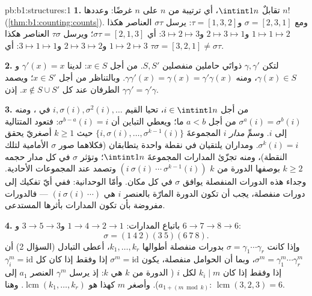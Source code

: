 \begin{solution}{pb:b1:structures:1}
\textbf{1.}  تقابلٌ  $\intint1n$، أي
ترتيبة من  $n$ على $n$ غرضًا: وعددها $n!$
(\cref{thm:b1:counting:counts}). ومع $\sigma = [2,3,1]$ و$\tau =
[1,3,2]$: يرسل $\sigma\tau$ العناصر هكذا $1 \mapsto 1 \mapsto 2$ و$2 \mapsto 3
\mapsto 1$ و$3 \mapsto 2 \mapsto 3$: أي $\sigma\tau = [2,1,3]$؛ ويرسل
$\tau\sigma$ العناصر هكذا $1 \mapsto 2 \mapsto 3$ و$2 \mapsto 3 \mapsto
2$ و$3 \mapsto 1 \mapsto 1$: أي $\tau\sigma = [3,2,1] \neq
\sigma\tau$.

\textbf{2.} لتكن $\gamma, \gamma'$ ذواتَي حاملين منفصلين $S, S'$.
من أجل $x \in S$: لدينا $\gamma'(x) = x$ و $\gamma(x) \in S$، ومنه
$\gamma\gamma'(x) = \gamma(x) = \gamma'\gamma(x)$. وبالتناظر
من أجل $x \in S'$؛ ويصمد الطرفان عند كل $x \notin S \cup S'$. إذن
$\gamma\gamma' = \gamma'\gamma$.

\textbf{3.} من أجل $i \in \intint1n$، تحيا القيم $i, \sigma(i),
\sigma^2(i), \dots$ في ، ومنه $\sigma^a(i) =
\sigma^b(i)$ من أجل $a < b$ ما؛ ويعطي التباين أن $\sigma^{b-a}(i)
= i$: فتعود المتتالية إلى $i$. وسمِّ \emph{مدار} $i$ المجموعةَ
$\{i, \sigma(i), \dots, \sigma^{k-1}(i)\}$ حيث $k \geq 1$
أصغريّ يحقق $\sigma^k(i) = i$. ومداران يلتقيان في نقطة
واحدة يتطابقان (فكلاهما صور $\sigma$ الأمامية لتلك
النقطة)، ومنه تجزّئ المدارات المجموعةَ $\intint1n$؛ وتؤثر $\sigma$ في كل
مدار حجمه $k \geq 2$ بوصفها الدورة من  $k$ $(i\ \sigma(i)\ \cdots\
\sigma^{k-1}(i))$ وتصمد عند المجموعات الأحادية. وجداء هذه
الدورات المنفصلة يوافق $\sigma$ في كل مكان. وأمّا الوحدانية: ففي
أيّ تفكيك إلى دورات منفصلة، يجب أن تكون الدورة المارّة بالعنصر $i$ هي $(i\ \sigma(i)\ \cdots)$ --- فالدورات مفروضة بأن تكون
المدارات بأثرها المستدعى.

\textbf{4.} باتباع المدارات: $1 \to 4 \to 2 \to 1$ و$3 \to 5
\to 3$ و $6 \to 7 \to 8 \to 6$:
\[
\sigma = (1\ 4\ 2)(3\ 5)(6\ 7\ 8) .
\]
وإذا كانت $\sigma = \gamma_1\cdots\gamma_r$ بدورات منفصلة
أطوالها $k_1, \dots, k_r$، أعطى التبادل (السؤال 2) أن
$\sigma^m = \gamma_1^m\cdots\gamma_r^m$، وبما أن الحوامل
منفصلة، يكون $\sigma^m = \mathrm{id}$ إذا وفقط إذا كان كل $\gamma_i^m =
\mathrm{id}$ إذا وفقط إذا كان $k_i \mid m$ لكل $i$ ( الدورة من  $k$ هي
$k$: إذ يرسل $\gamma^m$ العنصر $a_1$ إلى $a_{1 + (m \bmod k)}$). وأصغر
$m$ كهذا هو $\operatorname{lcm}(k_1, \dots, k_r)$. وهنا:
$\operatorname{lcm}(3, 2, 3) = 6$.


\end{solution}
